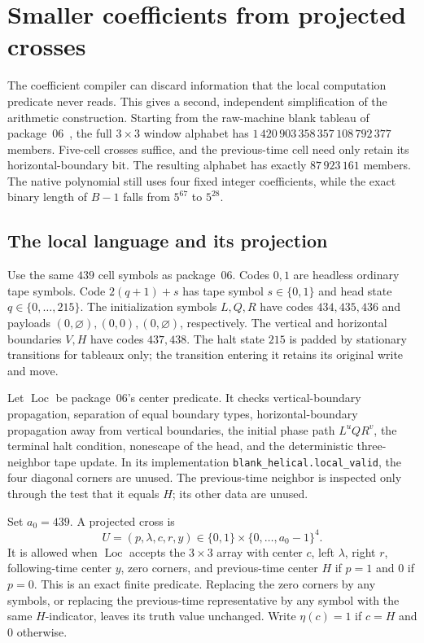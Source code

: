 \section{Smaller coefficients from projected crosses}
\label{sec:projected-crosses}
\label{sec:coefficients}

The coefficient compiler can discard information that the local computation
predicate never reads.  This gives a second, independent simplification of
the arithmetic construction.  Starting from the raw-machine blank tableau
of package~06~\cite{src06}, the full $3\times3$ window alphabet has
$1\,420\,903\,358\,357\,108\,792\,377$ members.  Five-cell crosses suffice,
and the previous-time cell need only retain its horizontal-boundary bit.
The resulting alphabet has exactly $87\,923\,161$ members.  The native
polynomial still uses four fixed integer coefficients, while the exact
binary length of $B-1$ falls from $5^{67}$ to $5^{28}$.

\subsection{The local language and its projection}

Use the same $439$ cell symbols as package~06.  Codes $0,1$ are headless
ordinary tape symbols.  Code $2(q+1)+s$ has tape symbol $s\in\{0,1\}$
and head state $q\in\{0,\ldots,215\}$.  The initialization symbols
$L,Q,R$ have codes $434,435,436$ and payloads
$(0,\varnothing),(0,0),(0,\varnothing)$, respectively.  The vertical
and horizontal boundaries $V,H$ have codes $437,438$.
The halt state $215$ is padded by stationary transitions for tableaux
only; the transition entering it retains its original write and move.

Let $\operatorname{Loc}$ be package~06's center predicate.  It checks
vertical-boundary propagation, separation of equal boundary types,
horizontal-boundary propagation away from vertical boundaries, the
initial phase path $L^uQR^v$, the terminal halt condition, nonescape of
the head, and the deterministic three-neighbor tape update.  In its
implementation \texttt{blank\_helical.local\_valid}, the four diagonal
corners are unused.  The previous-time neighbor is inspected only through
the test that it equals $H$; its other data are unused.

Set $a_0=439$.  A projected cross is
\[
 U=(p,\lambda,c,r,y)\in\{0,1\}\times\{0,\ldots,a_0-1\}^4.
\]
It is allowed when $\operatorname{Loc}$ accepts the $3\times3$ array with
center $c$, left $\lambda$, right $r$, following-time center $y$, zero
corners, and previous-time center $H$ if $p=1$ and $0$ if $p=0$.
This is an exact finite predicate.  Replacing the zero corners by any
symbols, or replacing the previous-time representative by any symbol
with the same $H$-indicator, leaves its truth value unchanged.
Write $\eta(c)=1$ if $c=H$ and $0$ otherwise.

